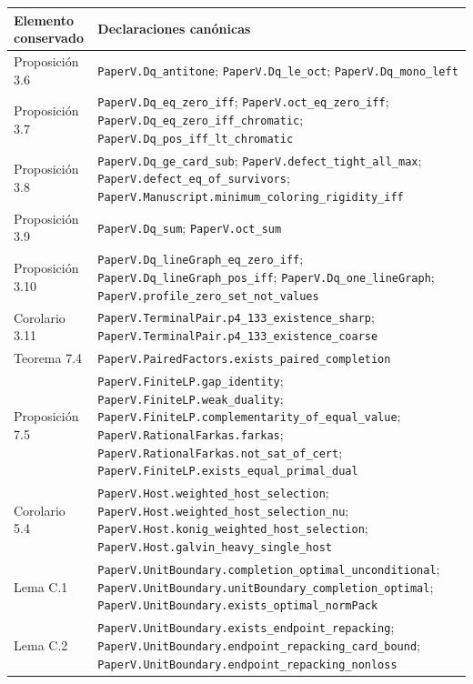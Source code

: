 \documentclass[spanish,11pt,a4paper]{article}
\newcounter{none}
\begin{document}
{\def\LTcaptype{none} %
\begin{longtable}[]{@{}
  >{\raggedright\arraybackslash}p{}
  >{\raggedright\arraybackslash}p{}@{}}
\toprule\noalign{}
\begin{minipage}[b]{\linewidth}\raggedright
Elemento conservado
\end{minipage} & \begin{minipage}[b]{\linewidth}\raggedright
Declaraciones canónicas
\end{minipage} \\
\midrule\noalign{}
\endhead
\bottomrule\noalign{}
\endlastfoot
Proposición 3.6 & \nolinkurl{PaperV.Dq_antitone};
\nolinkurl{PaperV.Dq_le_oct}; \nolinkurl{PaperV.Dq_mono_left} \\
Proposición 3.7 & \nolinkurl{PaperV.Dq_eq_zero_iff};
\nolinkurl{PaperV.oct_eq_zero_iff};
\nolinkurl{PaperV.Dq_eq_zero_iff_chromatic};
\nolinkurl{PaperV.Dq_pos_iff_lt_chromatic} \\
Proposición 3.8 & \nolinkurl{PaperV.Dq_ge_card_sub};
\nolinkurl{PaperV.defect_tight_all_max};
\nolinkurl{PaperV.defect_eq_of_survivors};
\nolinkurl{PaperV.Manuscript.minimum_coloring_rigidity_iff} \\
Proposición 3.9 & \texttt{PaperV.Dq\_sum}; \texttt{PaperV.oct\_sum} \\
Proposición 3.10 & \nolinkurl{PaperV.Dq_lineGraph_eq_zero_iff};
\nolinkurl{PaperV.Dq_lineGraph_pos_iff};
\nolinkurl{PaperV.Dq_one_lineGraph};
\nolinkurl{PaperV.profile_zero_set_not_values} \\
Corolario 3.11 & \nolinkurl{PaperV.TerminalPair.p4_133_existence_sharp};
\nolinkurl{PaperV.TerminalPair.p4_133_existence_coarse} \\
Teorema 7.4 &
\nolinkurl{PaperV.PairedFactors.exists_paired_completion} \\
Proposición 7.5 & \nolinkurl{PaperV.FiniteLP.gap_identity};
\nolinkurl{PaperV.FiniteLP.weak_duality};
\nolinkurl{PaperV.FiniteLP.complementarity_of_equal_value};
\nolinkurl{PaperV.RationalFarkas.farkas};
\nolinkurl{PaperV.RationalFarkas.not_sat_of_cert};
\nolinkurl{PaperV.FiniteLP.exists_equal_primal_dual} \\
Corolario 5.4 & \nolinkurl{PaperV.Host.weighted_host_selection};
\nolinkurl{PaperV.Host.weighted_host_selection_nu};
\nolinkurl{PaperV.Host.konig_weighted_host_selection};
\nolinkurl{PaperV.Host.galvin_heavy_single_host} \\
Lema C.1 &
\nolinkurl{PaperV.UnitBoundary.completion_optimal_unconditional};
\nolinkurl{PaperV.UnitBoundary.unitBoundary_completion_optimal};
\nolinkurl{PaperV.UnitBoundary.exists_optimal_normPack} \\
Lema C.2 & \nolinkurl{PaperV.UnitBoundary.exists_endpoint_repacking};
\nolinkurl{PaperV.UnitBoundary.endpoint_repacking_card_bound};
\nolinkurl{PaperV.UnitBoundary.endpoint_repacking_nonloss} \\
\end{longtable}
}
\end{document}
